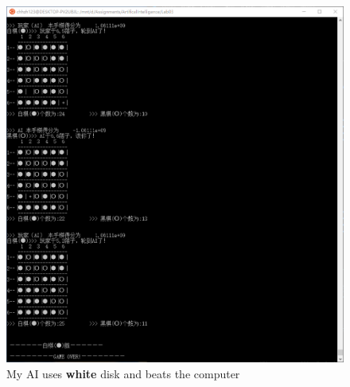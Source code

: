 ﻿\documentclass[a4paper, 11pt]{article}
\begin{document}
\begin{figure}[H]
  \centering
  \includegraphics[width=\linewidth]{fig/white.png}
  \caption{My AI uses \textbf{white} disk and beats the computer}
\end{figure}

\end{document}
